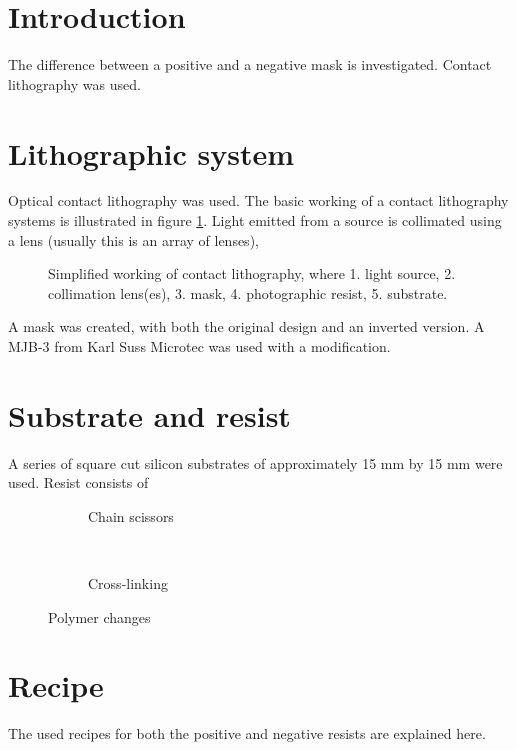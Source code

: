 \section*{Introduction}
The difference between a positive and a negative mask is investigated. Contact lithography was used.

\section*{Lithographic system}
Optical contact lithography was used. The basic working of a contact lithography systems is illustrated in figure \ref{fig:contact-litho}. Light emitted from a source is collimated using a lens (usually this is an array of lenses), 
\begin{figure}[H]
	\centering
	\resizebox{0.7\linewidth}{!}{}
	\caption{Simplified working of contact lithography, where 1. light source, 2. collimation lens(es), 3. mask, 4. photographic resist, 5. substrate.}
	\label{fig:contact-litho}
\end{figure}
A mask was created, with both the original design and an inverted version.  A MJB-3 from Karl Suss Microtec was used with a modification.

\section*{Substrate and resist}
A series of square cut silicon substrates of approximately 15 mm by 15 mm were used. Resist consists of 

\begin{figure}[H]
	\centering
	\begin{subfigure}[t]{0.45\linewidth}
		\centering
		\resizebox{\linewidth}{!}{}
		\caption{Chain scissors}
		\label{fig:chainscissor}
	\end{subfigure}
	~
	\begin{subfigure}[t]{0.45\linewidth}
		\centering
		\resizebox{\linewidth}{!}{}
		\caption{Cross-linking}
		\label{fig:crosslinking}
	\end{subfigure}
	\caption{Polymer changes}
	\label{fig:polymers}
\end{figure}


\section*{Recipe}
The used recipes for both the positive and negative resists are explained here.
